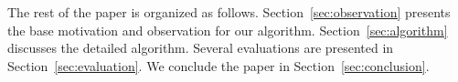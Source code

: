 
The rest of the paper is organized as follows. Section~\ref{sec:observation} presents the base motivation and observation for our algorithm. Section~\ref{sec:algorithm} discusses the detailed algorithm. Several evaluations are presented in Section~\ref{sec:evaluation}. We conclude the paper in Section~\ref{sec:conclusion}.